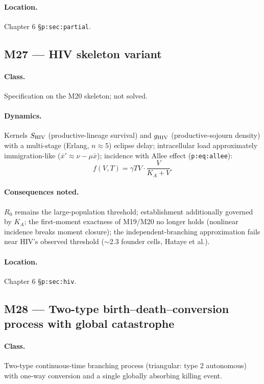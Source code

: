 \documentclass[11pt,a4paper]{article}
\begin{document}
\paragraph{Location.} Chapter 6 \S\texttt{p:sec:partial}.

\subsection{M27 --- HIV skeleton variant \quad [specification]}

\paragraph{Class.} Specification on the M20 skeleton; not solved.

\paragraph{Dynamics.} Kernels $S_{\rm HIV}$ (productive-lineage survival)
and $g_{\rm HIV}$ (productive-sojourn density) with a multi-stage (Erlang,
$n\approx5$) eclipse delay; intracellular load approximately
immigration-like ($\bar x'\approx\nu-\mu\bar x$); incidence with Allee
effect (\texttt{p:eq:allee}):
\[
f(V,T)=\gamma TV\cdot\frac{V}{K_A+V}.
\]

\paragraph{Consequences noted.} $R_0$ remains the large-population
threshold; establishment additionally governed by $K_A$; the
first-moment exactness of M19/M20 no longer holds (nonlinear incidence
breaks moment closure); the independent-branching approximation fails near
HIV's observed threshold ($\sim$2.3 founder cells, Hataye et al.).

\paragraph{Location.} Chapter 6 \S\texttt{p:sec:hiv}.

\subsection{M28 --- Two-type birth--death--conversion process with global catastrophe}
\label{sec:M28}

\paragraph{Class.} Two-type continuous-time branching process (triangular:
type 2 autonomous) with one-way conversion and a single globally absorbing
killing event.
\end{document}
